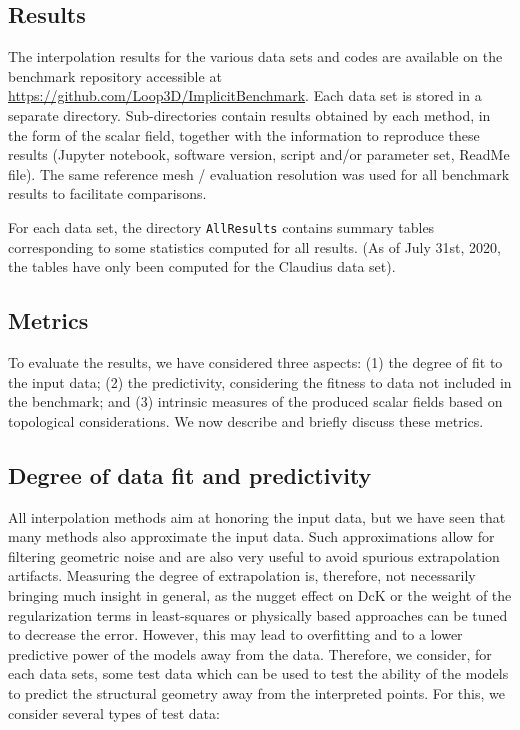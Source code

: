 \documentclass[preprint]{ring20}
\begin{document}
\subsection{Results}
The interpolation results for the various data sets and codes are available on the benchmark repository accessible at \url{https://github.com/Loop3D/ImplicitBenchmark}. Each data set is stored in a separate directory. Sub-directories contain results obtained by each method, in the form of the scalar field, together with the information to reproduce these results (Jupyter notebook, software version, script and/or parameter set, ReadMe file). The same reference mesh / evaluation resolution was used for all benchmark results to facilitate comparisons. 

For each data set, the directory \texttt{AllResults} contains summary tables corresponding to some statistics computed for all results. (As of July 31st, 2020, the tables have only been computed for the Claudius data set). 

\subsection{Metrics}
To evaluate the results, we have considered three aspects: (1) the degree of fit to the input data; (2) the predictivity, considering the fitness to data not included in the benchmark; and (3) intrinsic measures of the produced scalar fields based on topological considerations. We now describe and briefly discuss these metrics. 

\subsection{Degree of data fit and predictivity}

All interpolation methods aim at honoring the input data, but we have seen that many methods also approximate the input data. Such approximations allow for filtering geometric noise and are also very useful to avoid spurious extrapolation artifacts. 
Measuring the degree of extrapolation is, therefore, not necessarily bringing much insight in general, as the nugget effect on DcK or the weight of the regularization terms in least-squares or physically based approaches can be tuned to decrease the error. However, this may lead to overfitting and to a lower predictive power of the models away from the data. Therefore, we consider, for each data sets, some test data which can be used to test the ability of the models to predict the structural geometry away from the interpreted points. For this, we consider several types of test data:
\end{document}
